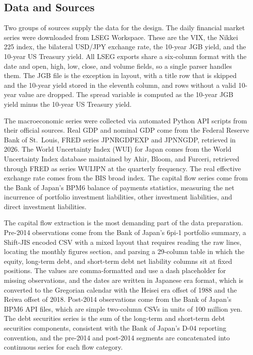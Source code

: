 \subsection{Data and Sources}

Two groups of sources supply the data for the design. The daily financial market series were downloaded from LSEG Workspace. These are the VIX, the Nikkei 225 index, the bilateral USD/JPY exchange rate, the 10-year JGB yield, and the 10-year US Treasury yield. All LSEG exports share a six-column format with the date and open, high, low, close, and volume fields, so a single parser handles them. The JGB file is the exception in layout, with a title row that is skipped and the 10-year yield stored in the eleventh column, and rows without a valid 10-year value are dropped. The spread variable is computed as the 10-year JGB yield minus the 10-year US Treasury yield.

The macroeconomic series were collected via automated Python API scripts from their official sources. Real GDP and nominal GDP come from the Federal Reserve Bank of St.\ Louis, FRED series JPNRGDPEXP and JPNNGDP, retrieved in 2026. The World Uncertainty Index (WUI) for Japan comes from the World Uncertainty Index database maintained by Ahir, Bloom, and Furceri, retrieved through FRED as series WUIJPN at the quarterly frequency. The real effective exchange rate comes from the BIS broad index. The capital flow series come from the Bank of Japan's BPM6 balance of payments statistics, measuring the net incurrence of portfolio investment liabilities, other investment liabilities, and direct investment liabilities.

The capital flow extraction is the most demanding part of the data preparation. Pre-2014 observations come from the Bank of Japan's 6pi-1 portfolio summary, a Shift-JIS encoded CSV with a mixed layout that requires reading the raw lines, locating the monthly figures section, and parsing a 29-column table in which the equity, long-term debt, and short-term debt net liability columns sit at fixed positions. The values are comma-formatted and use a dash placeholder for missing observations, and the dates are written in Japanese era format, which is converted to the Gregorian calendar with the Heisei era offset of 1988 and the Reiwa offset of 2018. Post-2014 observations come from the Bank of Japan's BPM6 API files, which are simple two-column CSVs in units of 100 million yen. The debt securities series is the sum of the long-term and short-term debt securities components, consistent with the Bank of Japan's D-04 reporting convention, and the pre-2014 and post-2014 segments are concatenated into continuous series for each flow category.


